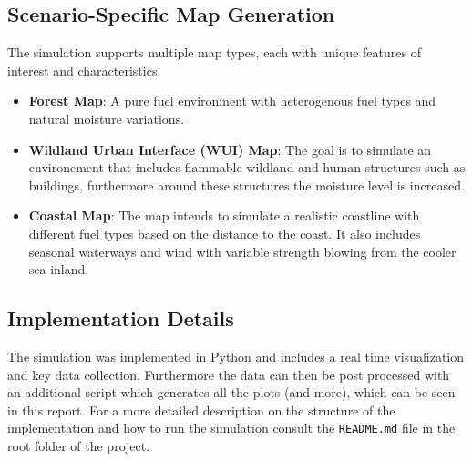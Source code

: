 \subsection{Scenario-Specific Map Generation}
The simulation supports multiple map types, each with unique features of interest and characteristics:
\begin{itemize}
	\item \textbf{Forest Map}: A pure fuel environment with heterogenous fuel types and natural moisture variations.
	\item \textbf{Wildland Urban Interface (WUI) Map}: The goal is to simulate an environement that includes flammable wildland and human structures such as buildings, furthermore around these structures the moisture level is increased.
	\item \textbf{Coastal Map}: The map intends to simulate a realistic coastline with different fuel types based on the distance to the coast. It also includes seasonal waterways and wind with variable strength blowing from the cooler sea inland.
\end{itemize}
\subsection{Implementation Details}
The simulation was implemented in Python and includes a real time visualization and key data collection. Furthermore the data can then be post processed with an additional script which generates all the plots (and more), which can be seen in this report. For a more detailed description on the structure of the implementation and how to run the simulation consult the \texttt{README.md} file in the root folder of the project.
